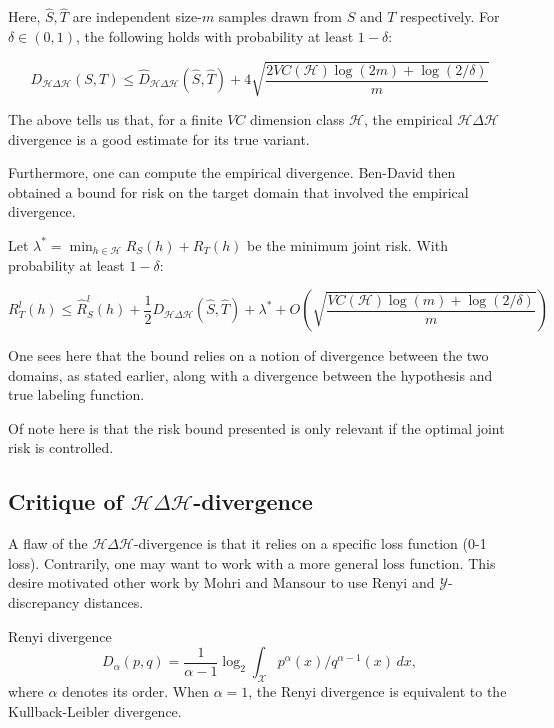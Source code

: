 \begin{theorem}
	Here, $\hat{S},\hat{T}$ are independent size-$m$ samples drawn from $S$ and $T$ respectively. For $\delta\in (0,1)$, the following holds with probability at least $1-\delta$:
	
	\[
	D_{\mathcal{H}\Delta \mathcal{H}}(S,T) \leq \hat{D}_{\mathcal{H}\Delta \mathcal{H}}(\hat{S},\hat{T}) + 
	4 \sqrt{\frac{2 VC(\mathcal{H}) \log(2m) + \log(2/\delta)}{m}}
	\]
\end{theorem}

The above tells us that, for a finite $VC$ dimension class $\mathcal{H}$, the empirical $\mathcal{H}\Delta \mathcal{H}$ divergence is a good estimate for its true variant.

Furthermore, one can compute the empirical divergence. Ben-David then obtained a bound for risk on the target domain that involved the empirical divergence.

\begin{theorem}
	Let $\lambda^* = \min_{h\in \mathcal{H}} R_S(h)+R_T(h)$ be the minimum joint risk.
	With probability at least $1-\delta$:
	
	\[
	R_T^l(h) \leq \hat{R}_S^l(h) + \frac{1}{2}D_{\mathcal{H}\Delta \mathcal{H}}(\hat{S},\hat{T}) + \lambda^{*} + 
	O \left( \sqrt{\frac{VC(\mathcal{H}) \log(m) + \log(2/\delta)}{m}}\right) 
	\]
\end{theorem}

One sees here that the bound relies on a notion of divergence between the two domains, as stated earlier, along with a divergence between the hypothesis and true labeling function.

Of note here is that the risk bound presented is only relevant if the optimal joint risk is controlled.

\subsection*{Critique of $\mathcal{H}\Delta\mathcal{H}$-divergence}

A flaw of the $\mathcal{H}\Delta\mathcal{H}$-divergence is that it relies on a specific loss function (0-1 loss). Contrarily, one may want to work with a more general loss function. This desire motivated other work by Mohri and Mansour to use Renyi and $\mathcal{Y}$-discrepancy distances.

\begin{definition}{Renyi divergence}
	\[
	D_{\alpha}(p,q) = \frac{1}{\alpha-1} \log_2 \int_{\mathcal{X}} p^{\alpha}(x)/q^{\alpha-1}(x) \, dx,
	\]
	where $\alpha$ denotes its order. When $\alpha=1$, the Renyi divergence is equivalent to the Kullback-Leibler divergence.
\end{definition}

